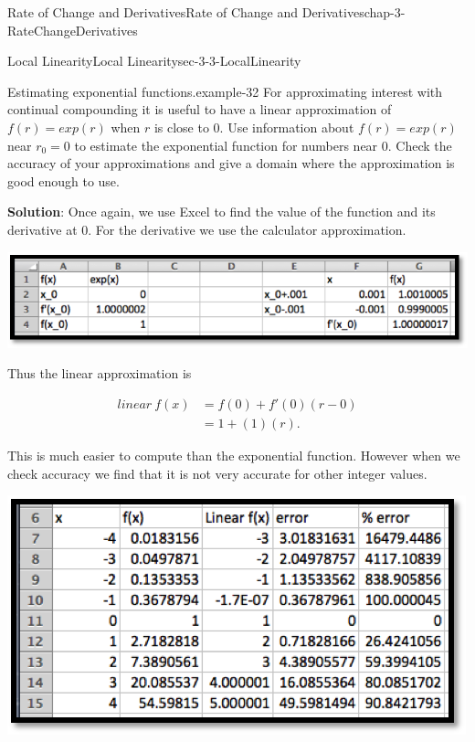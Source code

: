 \documentclass[oneside,10pt,]{book}
\newcommand{\terminology}[1]{\textbf{#1}}
\numberwithin{equation}{section}
\newcommand{\amp}{&}
\begin{document}
\begin{chapterptx}{Rate of Change and Derivatives}{}{Rate of Change and Derivatives}{}{}{chap-3-RateChangeDerivatives}
\begin{sectionptx}{Local Linearity}{}{Local Linearity}{}{}{sec-3-3-LocalLinearity}
\begin{example}{Estimating exponential functions.}{example-32}%
\hypertarget{p-1154}{}%
For approximating interest with continual compounding it is useful to have a linear approximation of \(f(r)=exp(r)\) when \(r\) is close to 0.  Use information about \(f(r)=exp(r)\) near \(r_0=0\) to estimate the exponential function for numbers near 0.  Check the accuracy of your approximations and give a domain where the approximation is good enough to use.%
\par
\hypertarget{p-1155}{}%
\terminology{Solution}:  Once again, we use Excel to find the value of the function and its derivative at 0.  For the derivative we use the calculator approximation.%
\begin{sidebyside}{1}{0.1}{0.1}{0}%
\begin{sbspanel}{0.8}%
\includegraphics[width=1\linewidth]{images/sec3-3-9.png}
\end{sbspanel}%
\end{sidebyside}%
\par
\hypertarget{p-1156}{}%
Thus the linear approximation is%
\par
\hypertarget{p-1157}{}%
%
\begin{equation*}
\begin{aligned} linear\ f(x) \amp = 
f(0)+f'(0)(r-0)\\
\amp = 1+(1)(r). \end{aligned}
\end{equation*}
%
\par
\hypertarget{p-1158}{}%
This is much easier to compute than the exponential function.  However when we check accuracy we find that it is not very accurate for other integer values.%
\begin{sidebyside}{1}{0.2}{0.2}{0}%
\begin{sbspanel}{0.6}%
\includegraphics[width=1\linewidth]{images/sec3-3-10.png}

\end{sbspanel}
\end{sidebyside}
\end{example}
\end{sectionptx}
\end{chapterptx}
\end{document}
